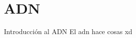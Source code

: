 \documentclass{AsignaturaDiapositivas}
\begin{document}
\Portada


\section{ADN}

\begin{frame}{Introducción al ADN}
    El adn hace cosas xd
\end{frame}
\end{document}
